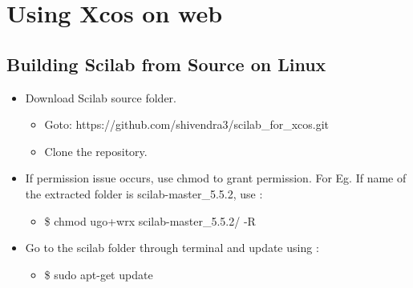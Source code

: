 \chapter{Using Xcos on web}
\label{ch:Setup}

\section{Building Scilab from Source on Linux}
\label{ch:Setup scilab}
\begin{itemize}
	\item Download Scilab source folder.
	\begin{itemize}
		\item Goto: https://github.com/shivendra3/scilab_for_xcos.git
		\item Clone the repository.
	\end{itemize}
	\item If permission issue occurs, use chmod to grant permission. For Eg. If name of the extracted folder is scilab-master_5.5.2, use :
	\begin{itemize}
		\item \$ chmod ugo+wrx scilab-master_5.5.2/ -R
	\end{itemize}
	\item Go to the scilab folder through terminal and update using :
	\begin{itemize}
		\item \$ sudo apt-get update
	\end{itemize}
\end{itemize}